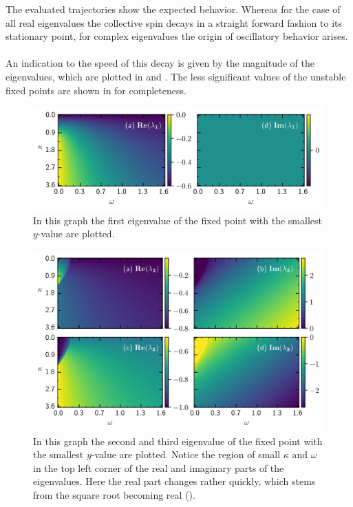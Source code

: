 The evaluated trajectories show the expected behavior. Whereas for the case of all real eigenvalues the collective spin decays in a straight forward fashion to its stationary point, for complex eigenvalues the origin of oscillatory behavior arises. %
\\\\An indication to the speed of this decay is given by the magnitude of the eigenvalues, which are plotted in  and . The less significant values of the unstable fixed points are shown in  for completeness.

\begin{figure}[H]
    \centering
    \includegraphics{pictures/lam_anal_s_1.png}
    \caption{In this graph the first eigenvalue of the fixed point with the smallest $y$-value are plotted.}
    \label{fig:eig_value_stab1}
\end{figure}
\begin{figure}[H]
    \centering
    \includegraphics{pictures/lam_anal_s_3.png}
    \caption{In this graph the second and third eigenvalue of the fixed point with the smallest $y$-value are plotted. Notice the region of small $\kappa$ and $\omega$ in the top left corner of the real and imaginary parts of the eigenvalues. Here the real part changes rather quickly, which stems from the square root becoming real ().
    }
    \label{fig:eig_value_stab2}
\end{figure}

